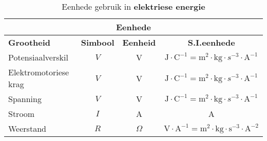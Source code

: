\begin{table}[H]
\begin{center}
\begin{tabular}{|l|c|c|c|}\hline \hline 
\multicolumn{4}{|c|}{\textbf{Eenhede}}\\ \hline \hline
\textbf{Grootheid} & \textbf{Simbool} & \textbf{Eenheid} &
\textbf{S.I.eenhede}\\ \hline
Potensiaalverskil & $V$ & V &
$\text{J}\cdot\text{C}^{-1}=\text{m}^2\cdot\text{kg}\cdot{s}^{-3}\cdot\text{A}^{
-1}$ \\ \hline
Elektromotoriese krag & $V$ & V &
$\text{J}\cdot\text{C}^{-1}=\text{m}^2\cdot\text{kg}\cdot{s}^{-3}\cdot\text{A}^{
-1}$ \\ \hline
Spanning & $V$ & V &
$\text{J}\cdot\text{C}^{-1}=\text{m}^2\cdot\text{kg}\cdot{s}^{-3}\cdot\text{A}^{
-1}$ \\ \hline
Stroom & $I$ & A & A \\ \hline
Weerstand & $R$ & $\Omega$ & $\text{V}\cdot\text{A}^{-1} =
\text{m}^2\cdot\text{kg}\cdot\text{s}^{-3}\cdot\text{A}^{-2}$ \\ \hline
\end{tabular}
\end{center}
\caption{Eenhede gebruik in \textbf{elektriese energie} }
\label{table:electricity::units}
\end{table}



